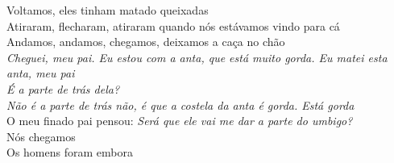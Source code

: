 \begin{linenumbers}\begingroup\raggedright
 
\noindent   Voltamos, eles tinham matado queixadas\\
  Atiraram, flecharam, atiraram quando nós estávamos vindo para cá\\
  Andamos, andamos, chegamos, deixamos a caça no chão\\
  \emph{Cheguei, meu pai. Eu estou com a anta, que está muito gorda. Eu matei esta anta, meu pai}\\
  \emph{É a parte de trás dela?}\\
  \emph{Não é a parte de trás não, é que a costela da anta é gorda. Está gorda}\\
  O meu finado pai pensou: \emph{Será que ele vai me dar a parte do umbigo?}\\
  Nós chegamos\\
  Os homens foram embora

\end{linenumbers}\endgroup

\bigskip

